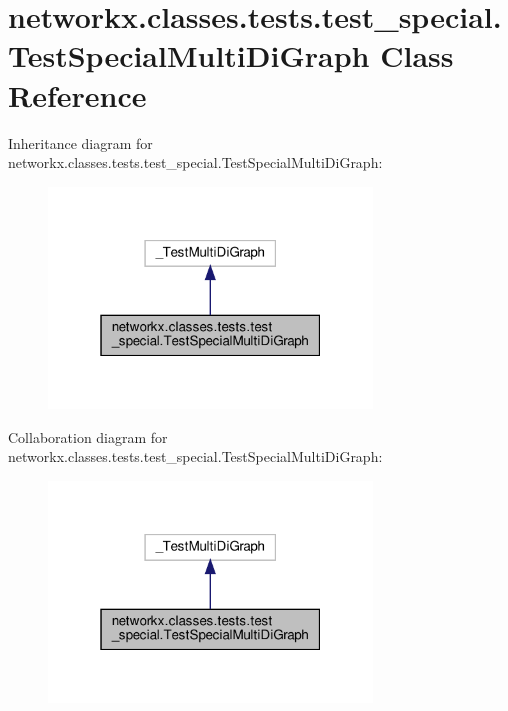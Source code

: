 \hypertarget{classnetworkx_1_1classes_1_1tests_1_1test__special_1_1TestSpecialMultiDiGraph}{}\section{networkx.\+classes.\+tests.\+test\+\_\+special.\+Test\+Special\+Multi\+Di\+Graph Class Reference}
\label{classnetworkx_1_1classes_1_1tests_1_1test__special_1_1TestSpecialMultiDiGraph}


Inheritance diagram for networkx.\+classes.\+tests.\+test\+\_\+special.\+Test\+Special\+Multi\+Di\+Graph\+:
\nopagebreak
\begin{figure}[H]
\begin{center}
\leavevmode
\includegraphics[width=244pt]{classnetworkx_1_1classes_1_1tests_1_1test__special_1_1TestSpecialMultiDiGraph__inherit__graph}
\end{center}
\end{figure}


Collaboration diagram for networkx.\+classes.\+tests.\+test\+\_\+special.\+Test\+Special\+Multi\+Di\+Graph\+:
\nopagebreak
\begin{figure}[H]
\begin{center}
\leavevmode
\includegraphics[width=244pt]{classnetworkx_1_1classes_1_1tests_1_1test__special_1_1TestSpecialMultiDiGraph__coll__graph}
\end{center}
\end{figure}
